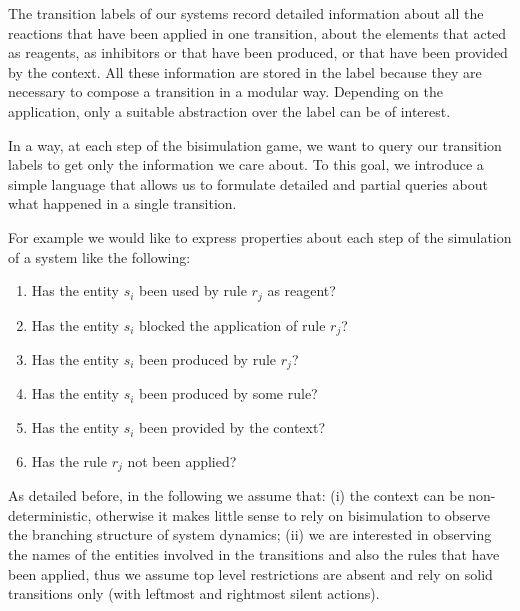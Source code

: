 The transition labels of our systems record detailed information about all the reactions that have been applied in one transition, about the elements that acted as reagents, as inhibitors or that have been produced, or that have been provided by the context.
All these information are stored in the label because they are necessary to compose a transition in a modular way. Depending on the application, only a suitable abstraction over the label can be of interest.

In a way, at each step of the bisimulation game, we want to query our transition labels to get only the information we care about.
To this goal, we introduce a simple language
that allows us to formulate detailed and partial queries about what happened in a single transition.

For example we would like to express properties about each step of the simulation of a system like the following:
\begin{enumerate}
\item Has the entity $s_i$ been used by rule $r_j$ as reagent?
\item Has the entity $s_i$ blocked the application of  rule $r_j$?
\item Has the entity $s_i$ been produced by rule $r_j$?
\item Has the entity $s_i$ been produced by some rule?
\item Has the entity $s_i$ been provided by the context? 
\item Has the rule $r_j$ not been applied? 
\end{enumerate}

As detailed before, in the following we assume that: (i) the context can be non-deterministic, otherwise it makes little sense to rely on bisimulation to observe the branching structure of system dynamics; (ii) we are interested in observing the names of the entities involved in the transitions and also the rules that have been applied, thus we assume top level restrictions are absent and rely on solid transitions only (with leftmost and rightmost silent actions).

